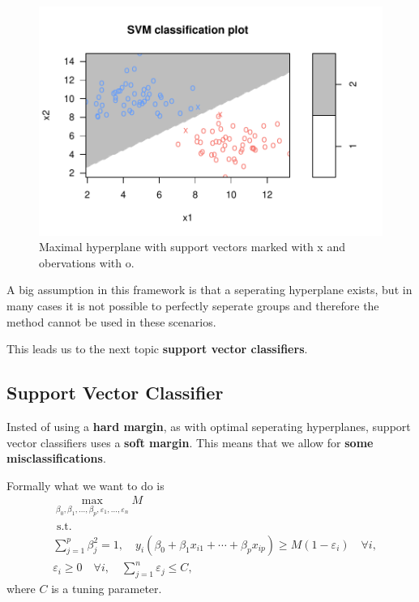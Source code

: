\documentclass[aspectratio=169,10pt]{beamer}
\begin{document}
\begin{frame}{\secname}{\subsecname}
  \begin{figure}
    \includegraphics[width=.6\textwidth]{scripts/output/osh_hyperplane.pdf}
    \caption{Maximal hyperplane with support vectors marked with x and obervations with o.}
  \end{figure}
\end{frame}

\begin{frame}{\secname}{\subsecname}
  A big assumption in this framework is that a seperating hyperplane exists, but in many cases it is not possible to perfectly seperate groups and therefore the method cannot be used in these scenarios.

  This leads us to the next topic \textbf{support vector classifiers}.
\end{frame}

\subsection{Support Vector Classifier}
\begin{frame}{\secname}{\subsecname}
  Insted of using a \textbf{hard margin}, as with optimal seperating hyperplanes, support vector classifiers uses a \textbf{soft margin}.
  This means that we allow for \textbf{some misclassifications}.

  Formally what we want to do is
  \begin{align}
    &\max_{\beta_0, \beta_1, \ldots, \beta_p, \varepsilon_1, \ldots, \varepsilon_n} M \\
    &\text{ s.t.} \nonumber \\
    & \sum_{j=1}^p \beta_j^2 = 1, \quad y_i(\beta_0 + \beta_1x_{i1} + \cdots + \beta_px_{ip}) \geq M(1-\varepsilon_i) \quad \forall i, \\ 
    &\varepsilon_i \geq 0 \quad \forall i, \quad \sum_{j=1}^n \varepsilon_j \leq C,
  \end{align}
  where $C$ is a tuning parameter.
\end{frame}
\end{document}
